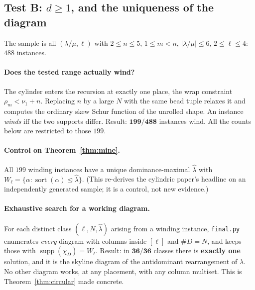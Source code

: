\documentclass[11pt]{article}
\theoremstyle{definition}
\DeclareMathOperator{\supp}{supp}
\DeclareMathOperator{\sort}{sort}
\begin{document}
\subsection{Test B: $d\ge1$, and the uniqueness of the diagram}

The sample is all $(\lambda/\mu,\ell)$ with $2\le n\le5$, $1\le m<n$, $|\lambda/\mu|\le6$,
$2\le\ell\le4$: $488$ instances.

\paragraph{Does the tested range actually wind?}
The cylinder enters the recursion at exactly one place, the wrap constraint
$\rho_m<\nu_1+n$. Replacing $n$ by a large $N$ with the same bead tuple relaxes it and computes
the ordinary skew Schur function of the unrolled shape. An instance \emph{winds} iff the two
supports differ. Result: $\mathbf{199/488}$ instances wind. All the counts below are restricted
to those $199$.

\paragraph{Control on Theorem~\ref{thm:mine}.} All $199$ winding instances have a unique
dominance-maximal $\hat\lambda$ with $W_\ell=\{\alpha:\sort(\alpha)\trianglelefteq
\hat\lambda\}$. (This re-derives the cylindric paper's headline on an independently generated
sample; it is a control, not new evidence.)

\paragraph{Exhaustive search for a working diagram.} For each distinct class
$(\ell,N,\hat\lambda)$ arising from a winding instance, \texttt{final.py} enumerates
\emph{every} diagram with columns inside $[\ell]$ and $\#D=N$, and keeps those with
$\supp(\chi_D)=W_\ell$. Result: in $\mathbf{36/36}$ classes there is \textbf{exactly one}
solution, and it is the skyline diagram of the antidominant rearrangement of $\hat\lambda$.
No other diagram works, at any placement, with any column multiset. This is
Theorem~\ref{thm:circular} made concrete.
\end{document}

